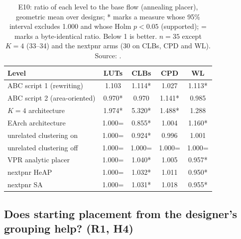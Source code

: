 \begin{table}[t]
\caption{E10: ratio of each level to the base flow (annealing placer), geometric mean over designs; * marks a measure whose 95\% interval excludes 1.000 and whose Holm $p<0.05$ (supported); = marks a byte-identical ratio. Below 1 is better. $n=35$ except $K=4$ (33--34) and the nextpnr arms (30 on CLBs, CPD and WL). Source: .}
\label{tab:e10}
\centering
\footnotesize
\begin{tabular}{@{}lcccc@{}}
\toprule
Level & LUTs & CLBs & CPD & WL \\
\midrule
ABC script 1 (rewriting) & 1.103 & 1.114* & 1.027 & 1.113* \\
ABC script 2 (area-oriented) & 0.970* & 0.970 & 1.141* & 0.985 \\
$K=4$ architecture & 1.974* & 5.320* & 1.488* & 1.288 \\
EArch architecture & 1.000= & 0.855* & 1.004 & 1.160* \\
unrelated clustering on & 1.000= & 0.924* & 0.996 & 1.001 \\
unrelated clustering off & 1.000= & 1.000= & 1.000= & 1.000= \\
VPR analytic placer & 1.000= & 1.040* & 1.005 & 0.957* \\
nextpnr HeAP & 1.000= & 1.032* & 1.011 & 0.950* \\
nextpnr SA & 1.000= & 1.031* & 1.018 & 0.955* \\
\bottomrule
\end{tabular}
\end{table}

\subsection{Does starting placement from the designer's grouping help? (R1, H4)}
\label{sec:e-seed}

